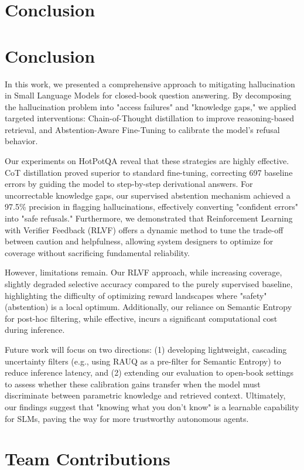 \documentclass{article}
\begin{document}
\section{Conclusion}
\section{Conclusion}
In this work, we presented a comprehensive approach to mitigating hallucination in Small Language Models for closed-book question answering. By decomposing the hallucination problem into "access failures" and "knowledge gaps," we applied targeted interventions: Chain-of-Thought distillation to improve reasoning-based retrieval, and Abstention-Aware Fine-Tuning to calibrate the model's refusal behavior.

Our experiments on HotPotQA reveal that these strategies are highly effective. CoT distillation proved superior to standard fine-tuning, correcting 697 baseline errors by guiding the model to step-by-step derivational answers. For uncorrectable knowledge gaps, our supervised abstention mechanism achieved a 97.5\% precision in flagging hallucinations, effectively converting "confident errors" into "safe refusals." Furthermore, we demonstrated that Reinforcement Learning with Verifier Feedback (RLVF) offers a dynamic method to tune the trade-off between caution and helpfulness, allowing system designers to optimize for coverage without sacrificing fundamental reliability.

However, limitations remain. Our RLVF approach, while increasing coverage, slightly degraded selective accuracy compared to the purely supervised baseline, highlighting the difficulty of optimizing reward landscapes where "safety" (abstention) is a local optimum. Additionally, our reliance on Semantic Entropy for post-hoc filtering, while effective, incurs a significant computational cost during inference.

Future work will focus on two directions: (1) developing lightweight, cascading uncertainty filters (e.g., using RAUQ as a pre-filter for Semantic Entropy) to reduce inference latency, and (2) extending our evaluation to open-book settings to assess whether these calibration gains transfer when the model must discriminate between parametric knowledge and retrieved context. Ultimately, our findings suggest that "knowing what you don't know" is a learnable capability for SLMs, paving the way for more trustworthy autonomous agents.

\section{Team Contributions}
\end{document}
